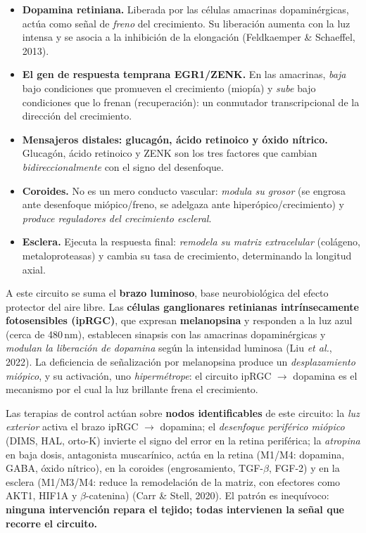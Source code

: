\documentclass[11pt,a4paper]{article}
\begin{document}
\begin{itemize}[leftmargin=1.4em]
  \item \textbf{Dopamina retiniana.} Liberada por las células amacrinas dopaminérgicas, actúa como señal de \emph{freno} del crecimiento. Su liberación aumenta con la luz intensa y se asocia a la inhibición de la elongación (Feldkaemper \& Schaeffel, 2013).
  \item \textbf{El gen de respuesta temprana EGR1/ZENK.} En las amacrinas, \emph{baja} bajo condiciones que promueven el crecimiento (miopía) y \emph{sube} bajo condiciones que lo frenan (recuperación): un conmutador transcripcional de la dirección del crecimiento.
  \item \textbf{Mensajeros distales: glucagón, ácido retinoico y óxido nítrico.} Glucagón, ácido retinoico y ZENK son los tres factores que cambian \emph{bidireccionalmente} con el signo del desenfoque.
  \item \textbf{Coroides.} No es un mero conducto vascular: \emph{modula su grosor} (se engrosa ante desenfoque miópico/freno, se adelgaza ante hiperópico/crecimiento) y \emph{produce reguladores del crecimiento escleral}.
  \item \textbf{Esclera.} Ejecuta la respuesta final: \emph{remodela su matriz extracelular} (colágeno, metaloproteasas) y cambia su tasa de crecimiento, determinando la longitud axial.
\end{itemize}

A este circuito se suma el \textbf{brazo luminoso}, base neurobiológica del efecto protector del aire libre. Las \textbf{células ganglionares retinianas intrínsecamente fotosensibles (ipRGC)}, que expresan \textbf{melanopsina} y responden a la luz azul (cerca de 480\,nm), establecen sinapsis con las amacrinas dopaminérgicas y \emph{modulan la liberación de dopamina} según la intensidad luminosa (Liu \emph{et al.}, 2022). La deficiencia de señalización por melanopsina produce un \emph{desplazamiento miópico}, y su activación, uno \emph{hipermétrope}: el circuito ipRGC $\rightarrow$ dopamina es el mecanismo por el cual la luz brillante frena el crecimiento.

Las terapias de control actúan sobre \textbf{nodos identificables} de este circuito: la \emph{luz exterior} activa el brazo ipRGC $\rightarrow$ dopamina; el \emph{desenfoque periférico miópico} (DIMS, HAL, orto-K) invierte el signo del error en la retina periférica; la \emph{atropina} en baja dosis, antagonista muscarínico, actúa en la retina (M1/M4: dopamina, GABA, óxido nítrico), en la coroides (engrosamiento, TGF-$\beta$, FGF-2) y en la esclera (M1/M3/M4: reduce la remodelación de la matriz, con efectores como AKT1, HIF1A y $\beta$-catenina) (Carr \& Stell, 2020). El patrón es inequívoco: \textbf{ninguna intervención repara el tejido; todas intervienen la señal que recorre el circuito.}
\end{document}
